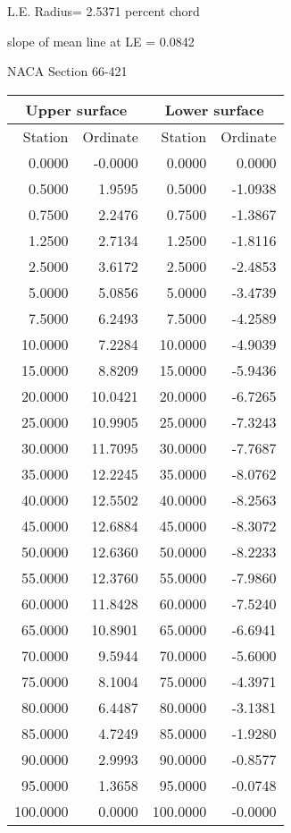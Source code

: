 \documentclass[11pt]{book}
\begin{document}
L.E. Radius=  2.5371 percent chord


 slope of mean line at LE =  0.0842
 \newpage
  \label{s66-421}
 \begin{Large}
 NACA Section 66-421
 \end{Large}
  
 \vspace{8mm}
 \begin{tabular}{|r|r|r|r|} \hline 
 \multicolumn{2}{|c|}{Upper surface} & \multicolumn{2}{|c|}{Lower surface} \\
 \hline
 Station & Ordinate & Station & Ordinate \\
 \hline
0.0000 & -0.0000 & 0.0000 & 0.0000 \\
0.5000 & 1.9595 & 0.5000 & -1.0938 \\
0.7500 & 2.2476 & 0.7500 & -1.3867 \\
1.2500 & 2.7134 & 1.2500 & -1.8116 \\
2.5000 & 3.6172 & 2.5000 & -2.4853 \\
5.0000 & 5.0856 & 5.0000 & -3.4739 \\
7.5000 & 6.2493 & 7.5000 & -4.2589 \\
10.0000 & 7.2284 & 10.0000 & -4.9039 \\
15.0000 & 8.8209 & 15.0000 & -5.9436 \\
20.0000 & 10.0421 & 20.0000 & -6.7265 \\
25.0000 & 10.9905 & 25.0000 & -7.3243 \\
30.0000 & 11.7095 & 30.0000 & -7.7687 \\
35.0000 & 12.2245 & 35.0000 & -8.0762 \\
40.0000 & 12.5502 & 40.0000 & -8.2563 \\
45.0000 & 12.6884 & 45.0000 & -8.3072 \\
50.0000 & 12.6360 & 50.0000 & -8.2233 \\
55.0000 & 12.3760 & 55.0000 & -7.9860 \\
60.0000 & 11.8428 & 60.0000 & -7.5240 \\
65.0000 & 10.8901 & 65.0000 & -6.6941 \\
70.0000 & 9.5944 & 70.0000 & -5.6000 \\
75.0000 & 8.1004 & 75.0000 & -4.3971 \\
80.0000 & 6.4487 & 80.0000 & -3.1381 \\
85.0000 & 4.7249 & 85.0000 & -1.9280 \\
90.0000 & 2.9993 & 90.0000 & -0.8577 \\
95.0000 & 1.3658 & 95.0000 & -0.0748 \\
100.0000 & 0.0000 & 100.0000 & -0.0000 \\
 \hline 
 \end{tabular}
\end{document}
